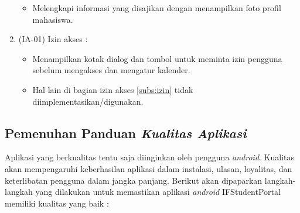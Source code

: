 \begin{enumerate}
    \begin{itemize}
        \item Melengkapi informasi yang disajikan dengan menampilkan foto profil mahasiswa.
        \end{itemize}
    \item (IA-01) Izin akses : 
    \begin{itemize}
        \item Menampilkan kotak dialog dan tombol untuk meminta izin pengguna sebelum mengakses dan mengatur kalender.
        \item Hal lain di bagian izin akses \ref{subs:izin} tidak diimplementasikan/digunakan.
        \end{itemize}
\end{enumerate}

\subsection{Pemenuhan Panduan \textit{Kualitas Aplikasi}}
Aplikasi yang berkualitas tentu saja diinginkan oleh pengguna \textit{android}. Kualitas akan mempengaruhi keberhasilan aplikasi dalam instalasi, ulasan, loyalitas, dan keterlibatan pengguna  dalam jangka panjang. Berikut akan dipaparkan langkah-langkah yang dilakukan untuk memastikan aplikasi \textit{android} IFStudentPortal memiliki kualitas yang baik :

